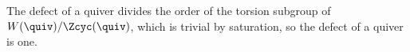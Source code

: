 \begin{lemma}[Defect]\label{sh-0020}
The defect of a quiver divides the order of the torsion subgroup of $W(\quiv) / \Zcyc(\quiv)$, which is trivial by saturation, so the defect of a quiver is one.
\end{lemma}